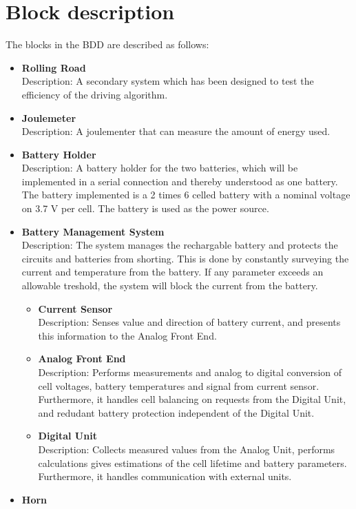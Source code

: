 \section{Block description}
The blocks in the BDD are described as follows:

\begin{itemize}
	\item \textbf{Rolling Road}\\
	Description: A secondary system which has been designed to test the efficiency of the driving algorithm.
	\item \textbf{Joulemeter}\\
	Description: A joulementer that can measure the amount of energy used.
	\item \textbf{Battery Holder}\\
	Description: A battery holder for the two batteries, which will be implemented in a serial connection and thereby understood as one battery. The battery implemented is a 2 times 6 celled battery with a nominal voltage on 3.7 V per cell. The battery is used as the power source.
	\item \textbf{Battery Management System}\\
	Description: The system manages the rechargable battery and protects the circuits and batteries from shorting. This is done by constantly surveying the current and temperature from the battery. If any parameter exceeds an allowable treshold, the system will block the current from the battery.
	\begin{itemize}
		\item \textbf{Current Sensor}\\
		Description: Senses value and direction of battery current, and presents this information to the Analog Front End.
		\item \textbf{Analog Front End}\\
		Description: Performs measurements and analog to digital conversion of cell voltages, battery temperatures and signal from current sensor. Furthermore, it handles cell balancing on requests from the Digital Unit, and redudant battery protection independent of the Digital Unit.
		\item \textbf{Digital Unit}\\
		Description: Collects measured values from the Analog Unit, performs calculations gives estimations of the cell lifetime and battery parameters. Furthermore, it handles communication with external units.
	\end{itemize}
	\item \textbf{Horn}\\

\end{itemize}
